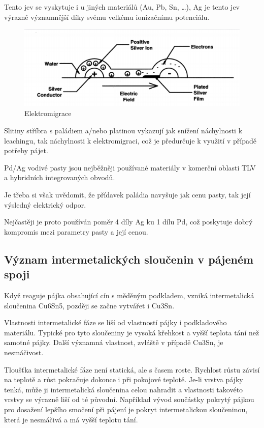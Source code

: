 Tento jev se vyskytuje i u jiných materiálů (Au, Pb, Sn, …), Ag je tento jev výrazně
významnější díky svému velkému ionizačnímu potenciálu.

\begin{figure}[h]
   \begin{center}
     \includegraphics[scale=0.6]{images/Migrace.png}
   \end{center}
   \caption{Elektromigrace}
\end{figure}


Slitiny stříbra s paládiem a/nebo platinou vykazují jak snížení náchylnosti k leachingu, tak
náchylnosti k elektromigraci, což je předurčuje k využití v případě potřeby pájet.

Pd/Ag vodivé pasty jsou nejběžněji používané materiály v komerční oblasti TLV a hybridních
integrovaných obvodů.

Je třeba si však uvědomit, že přídavek paládia navyšuje jak cenu pasty, tak její výsledný
elektrický odpor.

Nejčastěji je proto používán poměr 4 díly Ag ku 1 dílu Pd, což poskytuje dobrý kompromis mezi
parametry pasty a její cenou.

\subsection{Význam intermetalických sloučenin v pájeném spoji}
Když reaguje pájka obsahující cín s měděným podkladem, vzniká intermetalická sloučenina Cu6Sn5, později se začne vytvářet i Cu3Sn.

Vlastnosti intermetalické fáze se liší od vlastností pájky i podkladového materiálu. Typické
pro tyto sloučeniny je vysoká křehkost a vyšší teplota tání než samotné pájky. Další významná vlastnost, zvláště v případě Cu3Sn, je nesmáčivost.

Tloušťka intermetalické fáze není statická, ale s časem roste. Rychlost růstu závisí na teplotě a růst pokračuje dokonce i při pokojové teplotě. Je-li vrstva pájky tenká, může ji intermetalická sloučenina celou nahradit a vlastnosti takovéto vrstvy se výrazně liší od té původní. Například vývod součástky pokrytý pájkou pro dosažení lepšího smočení při pájení je pokryt intermetalickou sloučeninou, která je nesmáčivá a má vyšší teplotu tání.

